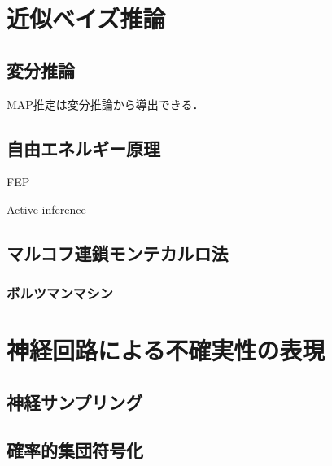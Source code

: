 \documentclass[titlepage]{ltjsbook}
\begin{document}
\section{近似ベイズ推論}
\subsection{変分推論}
MAP推定は変分推論から導出できる．

\subsection{自由エネルギー原理}
FEP

Active inference

\subsection{マルコフ連鎖モンテカルロ法}
\subsubsection{ボルツマンマシン}

\section{神経回路による不確実性の表現}
\subsection{神経サンプリング}

\subsection{確率的集団符号化}

\printbibliography[segment=\therefsegment,heading=subbibliography,title={参考文献}]
\end{document}
